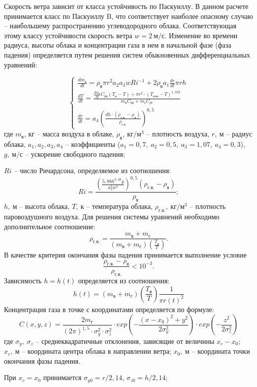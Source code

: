Скорость ветра зависит от класса устойчивость по Паскуиллу. В данном расчете принимается класс по Паскуиллу B, что соответствует наиболее опасному случаю – наибольшему распространению углеводородного облака. Соответствующая этому классу устойчивости скорость ветра $w = 2 \ м/с$.
Изменение во времени радиуса, высоты облака и концентрации газа в нем в начальной фазе (фаза падения) определяется путем решения систем обыкновенных дифференциальных уравнений:

\[
	\left\{
	\begin{array}{ll}
		\frac{dm_в}{dt} = \rho_в \pi r^2 a_2 a_3 w Ri^{-1} + 2 \rho_в a_1 \frac{dr}{dt} \pi r h \\
		\frac{dT}{dt} = \frac{
		\frac{dm_в}{dt} C_{pв} (T_в - T) + \pi r^2 \cdot (T_{пов} - T)^{1,333}
		}{
		m_в C_{pв} + m_г C_{pг}
		}\\
		\frac{dr}{dt} = a_4 \left(
		\frac{
		dh \cdot (\rho_{г.в.} - \rho_в)
		}{
		\rho_{г.в.}
		}
		\right)^{0,5}
	\end{array}
	\right.
\]
где $m_в$, кг – масса воздуха в облаке, $\rho_в, \ кг/м^3$ – плотность воздуха, $r, \ м$ – радиус облака, $a_1, a_2, a_3, a_4$ – коэффициенты ($a_1=0,7, \ a_2=0,5, \ a_3=1,07, \ a_4=0,3$), $g, \ м/с$ – ускорение свободного падения;

$Ri$ – число Ричардсона, определяемое из соотношения:
$$
Ri = \frac{
\left(
\frac{
5,88h^{0,48}g
}{
a_3^2 w^2
}
\right)^{0,5}
(\rho_{г.в.} - \rho_в)
}{\rho_в};
$$
$h, \ м$ – высота облака, $T, \ к$ – температура облака, $\rho_{г.в.}, \ кг/м^3$ – плотность паровоздушного воздуха.
Для решения системы уравнений необходимо дополнительное соотношение:
$$
\rho_{г.в.} = \frac{
m_в + m_г
}{
\left(
m_в + m_г
\right)
\left(
\frac{T_в}{T}
\right)
}.
$$
В качестве критерия окончания фазы падения принимается выполнение условие
$$
\frac{\rho_{г.в.} - \rho_в}{\rho_{г.в.}} < 10^{-3}.
$$
Зависимость $h=h(t)$ определяется из соотношения:
$$
h(t) = \left(
m_в + m_г
\right)
\left(
\frac{T_в}{T}
\right)
\frac{
1
}{
\pi r(t)^2
}
$$
Концентрация газа в точке с координатами  определяется по формуле:
$$
C(x, y, z) = \frac{
2m_г
}{
(2\pi)^{1,5} \cdot \sigma_y^2 \cdot \sigma_z^2
} \cdot
exp\left(
-\frac{
(x - x_0)^2 + y^2
}{
2\sigma_y^2
}
\right) \cdot
exp\left(
-\frac{
z^2
}{
2\sigma_z^2
}
\right)
$$
где $\sigma_y, \ \sigma_z$ – среднеквадратичные отклонения, зависящие от величины $x_c - x_0$; $x_c, \ м$ – координата центра облака в направлении ветра; $x_0, \ м$ – координата точки окончания фазы падения.

При $x_c = x_0$ принимается $\sigma_{y0}=r/2,14$, $\sigma_{z0}=h/2,14$;

